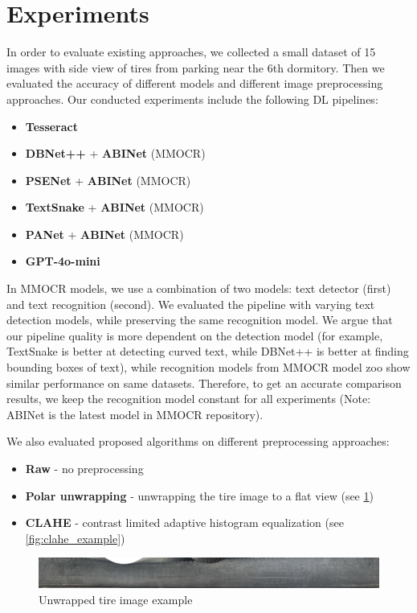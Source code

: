 \documentclass{article}
\begin{document}
\section{Experiments}

In order to evaluate existing approaches, we collected a small dataset of 15 images with side view of tires from parking near the 6th dormitory. Then we evaluated the accuracy of different models and different image preprocessing approaches. Our conducted experiments include the following DL pipelines:

\begin{itemize}
    \item \textbf{Tesseract}
    \item \textbf{DBNet++} + \textbf{ABINet} (MMOCR)
    \item \textbf{PSENet} + \textbf{ABINet} (MMOCR)
    \item \textbf{TextSnake} + \textbf{ABINet} (MMOCR)
    \item \textbf{PANet} + \textbf{ABINet} (MMOCR)
    \item \textbf{GPT-4o-mini}
\end{itemize}

In MMOCR models, we use a combination of two models: text detector (first) and text recognition (second). We evaluated the pipeline with varying text detection models, while preserving the same recognition model. We argue that our pipeline quality is more dependent on the detection model (for example, TextSnake is better at detecting curved text, while DBNet++ is better at finding bounding boxes of text), while recognition models from MMOCR model zoo show similar performance on same datasets. Therefore, to get an accurate comparison results, we keep the recognition model constant for all experiments (Note: ABINet is the latest model in MMOCR repository).

We also evaluated proposed algorithms on different preprocessing approaches:

\begin{itemize}
    \item \textbf{Raw} - no preprocessing
    \item \textbf{Polar unwrapping} - unwrapping the tire image to a flat view (see \ref{fig:unwrapped_tire})
    \item \textbf{CLAHE} - contrast limited adaptive histogram equalization (see \ref{fig:clahe_example})
\end{itemize}

\begin{figure}[H]
    \centering
    \includegraphics[width=1.\textwidth]{assets/unwrapped_example.png}
    \caption{Unwrapped tire image example}
    \label{fig:unwrapped_tire}
\end{figure}
\end{document}
